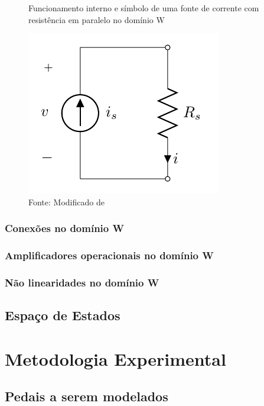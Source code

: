 	\begin{figure}[h]
		\label{figFonteCorrenteDominioW}
		\caption{Funcionamento interno e símbolo de uma fonte de corrente com resistência em paralelo no domínio W}
		\includegraphics[scale=0.5]{images/fonteCorrenteModelada}
		\centering
		\caption*{Fonte: Modificado de \cite{Bogason2017}}
	\end{figure}
	
	
	\subsection{Conexões no domínio W}
	\label{secConexoesNoDominioW}
	
	\subsection{Amplificadores operacionais no domínio W}
	\subsection{Não linearidades no domínio W}
	
	\section{Espaço de Estados}

	\chapter{Metodologia Experimental}
	
	\section{Pedais a serem modelados}
	
